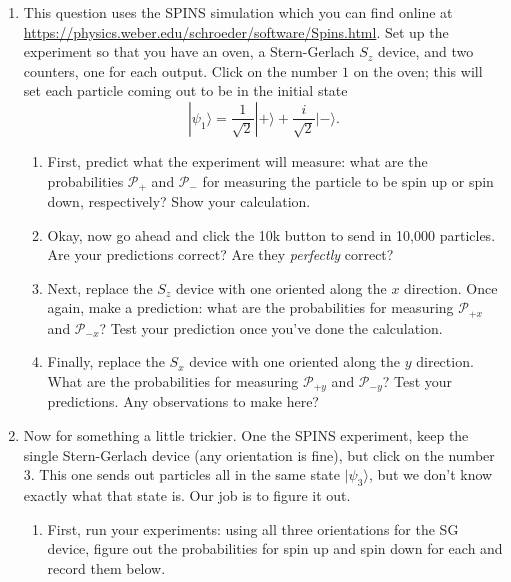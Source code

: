 \documentclass[10pt, letterpaper, twoside, openany]{article}
\newcommand{\ket}[1]{| #1 \rangle}
\begin{document}
\begin{enumerate}
\item This question uses the SPINS simulation which you can find online at \url{https://physics.weber.edu/schroeder/software/Spins.html}.  Set up the experiment so that you have an oven, a Stern-Gerlach $S_z$ device, and two counters, one for each output. Click on the number $1$ on the oven; this will set each particle coming out to be in the initial state
\[
\ket{\psi_1} = \frac{1}{\sqrt{2}} \ket{+} + \frac{i}{\sqrt{2}} \ket{-}.
\]
\begin{enumerate}
\item First, predict what the experiment will measure:  what are the probabilities $\mathcal{P}_+$ and $\mathcal{P}_-$ for measuring the particle to be spin up or spin down, respectively?  Show your calculation.

\vspace{2in}

\item Okay, now go ahead and click the 10k button to send in 10,000 particles.  Are your predictions correct?  Are they \emph{perfectly} correct?

\vspace{1in}

\item Next, replace the $S_z$ device with one oriented along the $x$ direction.  Once again, make a prediction: what are the probabilities for measuring $\mathcal{P}_{+x}$ and $\mathcal{P}_{-x}$?  Test your prediction once you've done the calculation.

\newpage

\item Finally, replace the $S_x$ device with one oriented along the $y$ direction.  What are the probabilities for measuring $\mathcal{P}_{+y}$ and $\mathcal{P}_{-y}$?  Test your predictions.  Any observations to make here?

\end{enumerate}

\vspace{3in}

\item Now for something a little trickier.  One the SPINS experiment, keep the single Stern-Gerlach device (any orientation is fine), but click on the number $3$.  This one sends out particles all in the same state $\ket{\psi_3}$, but we don't know exactly what that state is.  Our job is to figure it out.
\begin{enumerate}
\item First, run your experiments: using all three orientations for the SG device, figure out the probabilities for spin up and spin down for each and record them below.


\end{enumerate}
\end{enumerate}
\end{document}
